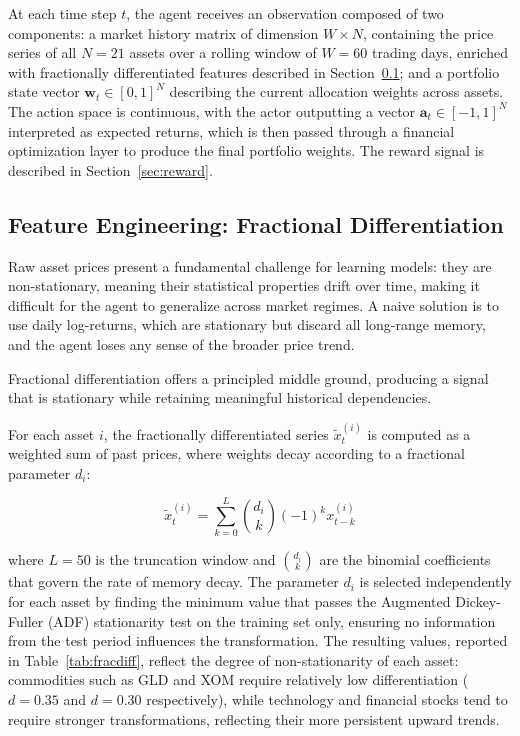 \documentclass[final]{article}
\begin{document}
At each time step $t$, the agent receives an observation composed of two components: a market history matrix of dimension
$W \times N$, containing the price series of all $N = 21$ assets over a rolling window of $W = 60$ trading days, enriched with
fractionally differentiated features described in Section~\ref{sec:fracdiff}; and a portfolio state vector
$\mathbf{w}_t \in [0, 1]^N$ describing the current allocation weights across assets. The action space is continuous, with
the actor outputting a vector $\mathbf{a}_t \in [-1, 1]^N$ interpreted as expected returns, which is then passed through
a financial optimization layer to produce the final portfolio weights. The reward signal is described in Section~\ref{sec:reward}.

\subsection{Feature Engineering: Fractional Differentiation}
\label{sec:fracdiff}
Raw asset prices present a fundamental challenge for learning models: they are non-stationary, meaning their statistical
properties drift over time, making it difficult for the agent to generalize across market regimes. A naive solution is
to use daily log-returns, which are stationary but discard all long-range memory, and the agent loses any sense of the
broader price trend.

Fractional differentiation offers a principled middle ground, producing a signal that is stationary while retaining
meaningful historical dependencies.

For each asset $i$, the fractionally differentiated series $\tilde{x}_t^{(i)}$ is
computed as a weighted sum of past prices, where weights decay according to a
fractional parameter $d_i$:

\begin{equation}
    \tilde{x}_t^{(i)} = \sum_{k=0}^{L} \binom{d_i}{k} (-1)^k x_{t-k}^{(i)}
\end{equation}

where $L = 50$ is the truncation window and $\binom{d_i}{k}$ are the binomial
coefficients that govern the rate of memory decay. The parameter $d_i$ is selected
independently for each asset by finding the minimum value that passes the Augmented
Dickey-Fuller (ADF) stationarity test on the training set only, ensuring no
information from the test period influences the transformation. The resulting values,
reported in Table~\ref{tab:fracdiff}, reflect the degree of non-stationarity of
each asset: commodities such as GLD and XOM require relatively low differentiation
($d = 0.35$ and $d = 0.30$ respectively), while technology and financial stocks tend
to require stronger transformations, reflecting their more persistent upward trends.
\end{document}
